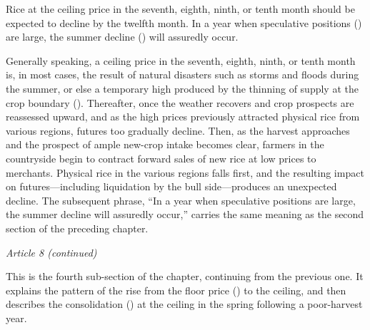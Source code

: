 
\begin{sokyubox}
{\small\itshape\color{sokyubar} }

\medskip
Rice at the ceiling price in the seventh, eighth, ninth, or tenth month
should be expected to decline by the twelfth month. In a year when
speculative positions () are large, the summer decline
() will assuredly occur.
\end{sokyubox}

\commentary
Generally speaking, a ceiling price in the seventh, eighth, ninth, or
tenth month is, in most cases, the result of natural disasters such as
storms and floods during the summer, or else a temporary high produced by
the thinning of supply at the crop boundary ().
Thereafter, once the weather recovers and crop prospects are reassessed
upward, and as the high prices previously attracted physical rice from
various regions, futures too gradually decline. Then, as the harvest
approaches and the prospect of ample new-crop intake becomes clear,
farmers in the countryside begin to contract forward sales of new rice at
low prices to merchants. Physical rice in the various regions falls
first, and the resulting impact on futures---including liquidation by the
bull side---produces an unexpected decline. The subsequent phrase, ``In a
year when speculative positions are large, the summer decline will
assuredly occur,'' carries the same meaning as the second section of the
preceding chapter.

\begin{sokyubox}
{\small\itshape\color{sokyubar} Article 8 (continued)}

\medskip
This is the fourth sub-section of the chapter, continuing from the
previous one. It explains the pattern of the rise from the floor price
() to the ceiling, and then describes the
consolidation () at the ceiling in the spring following
a poor-harvest year.
\end{sokyubox}

